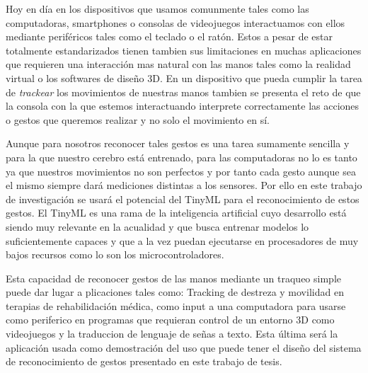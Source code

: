 Hoy en día en los dispositivos que usamos comunmente tales como las computadoras, smartphones o consolas de videojuegos interactuamos con ellos mediante periféricos tales como el teclado o el ratón. Estos a pesar de estar totalmente estandarizados tienen tambien sus limitaciones en muchas aplicaciones que requieren una interacción mas natural con las manos tales como la realidad virtual o los softwares de diseño 3D. En un dispositivo que pueda cumplir la tarea de \textit{trackear} los movimientos de nuestras manos tambien se presenta el reto de que la consola con la que estemos interactuando interprete correctamente las acciones o gestos que queremos realizar y no solo el movimiento en sí. 

Aunque para nosotros reconocer tales gestos es una tarea sumamente sencilla y para la que nuestro cerebro está entrenado, para las computadoras no lo es tanto ya que nuestros movimientos no son perfectos y por tanto cada gesto aunque sea el mismo siempre dará mediciones distintas a los sensores. Por ello en este trabajo de investigación se usará el potencial del TinyML para el reconocimiento de estos gestos. El TinyML es una rama de la inteligencia artificial cuyo desarrollo está siendo muy relevante en la acualidad y que busca entrenar modelos lo suficientemente capaces y que a la vez puedan ejecutarse en procesadores de muy bajos recursos como lo son los microcontroladores.

Esta capacidad de reconocer gestos de las manos mediante un traqueo simple puede dar lugar a plicaciones tales como: Tracking de destreza y movilidad en terapias de rehabilidación médica, como input a una computadora para usarse como periferico en programas que requieran control de un entorno 3D como videojuegos y la traduccion de lenguaje de señas a texto. Esta última será la aplicación usada como demostración del uso que puede tener el diseño del sistema de reconocimiento de gestos presentado en este trabajo de tesis.
